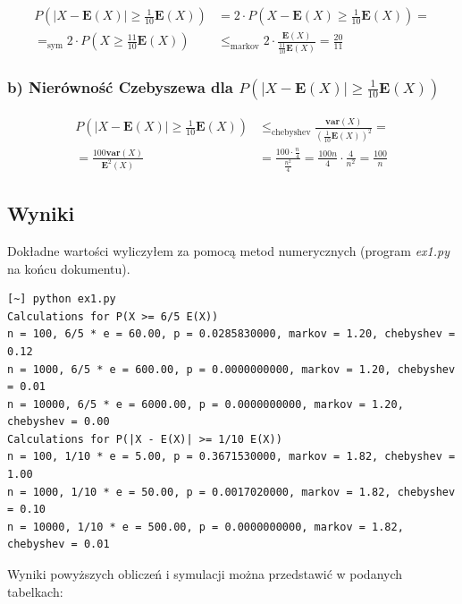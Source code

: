 \documentclass{article}
\begin{document}
\begin{align*}
    P\left(|X-\mathbf{E}(X)|\geq \frac{1}{10} \mathbf{E}(X)\right) &= 2 \cdot P\left(X-\mathbf{E}(X)\geq \frac{1}{10} \mathbf{E}(X)\right)=\\
    =_{\text{sym}} 2\cdot P\left(X\geq \frac{11}{10}\mathbf{E}(X)\right) &\leq_{\text{markov}} 2 \cdot \frac{\mathbf{E}(X)}{\frac{11}{10}\mathbf{E}(X)} = \frac{20}{11}
\end{align*}

\subsubsection{b) Nierówność Czebyszewa dla $P(|X - \mathbf{E}(X)| \geq \frac{1}{10} \mathbf{E}(X))$}
\begin{align}
    P\left(|X-\mathbf{E}(X)|\geq \frac{1}{10} \mathbf{E}(X)\right) &\leq_{\text{chebyshev}} \frac{\mathbf{var}(X)}{\left(\frac{1}{10} \mathbf{E}(X)\right)^2} =\\
    = \frac{100\mathbf{var}(X)}{\mathbf{E}^2(X)} &= \frac{100\cdot \frac{n}{4}}{\frac{n^2}{4}} = \frac{100n}{4} \cdot \frac{4}{n^2} = \frac{100}{n}
\end{align}

\subsection{Wyniki}

Dokładne wartości wyliczyłem za pomocą metod numerycznych (program \textit{ex1.py} na końcu dokumentu).

\begin{verbatim}
[~] python ex1.py                                                                                       
Calculations for P(X >= 6/5 E(X))
n = 100, 6/5 * e = 60.00, p = 0.0285830000, markov = 1.20, chebyshev = 0.12
n = 1000, 6/5 * e = 600.00, p = 0.0000000000, markov = 1.20, chebyshev = 0.01
n = 10000, 6/5 * e = 6000.00, p = 0.0000000000, markov = 1.20, chebyshev = 0.00
Calculations for P(|X - E(X)| >= 1/10 E(X))
n = 100, 1/10 * e = 5.00, p = 0.3671530000, markov = 1.82, chebyshev = 1.00
n = 1000, 1/10 * e = 50.00, p = 0.0017020000, markov = 1.82, chebyshev = 0.10
n = 10000, 1/10 * e = 500.00, p = 0.0000000000, markov = 1.82, chebyshev = 0.01
\end{verbatim}

\noindent
Wyniki powyższych obliczeń i symulacji można przedstawić w podanych tabelkach:
\end{document}
